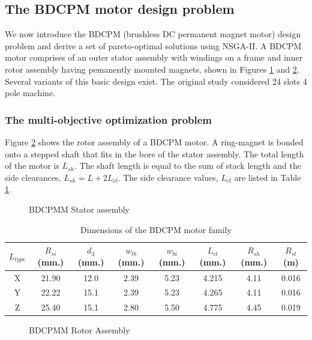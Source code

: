 \subsection{The BDCPM motor design problem}
We now introduce the BDCPM (brushless DC permanent magnet motor) 
design problem and derive a set of pareto-optimal solutions using 
NSGA-II. A BDCPM motor comprises of an outer stator assembly with 
windings on a frame  and inner rotor assembly having pemanently 
mounted magnets, shown in Figures \ref{bdcpmStator} and 
\ref{bdcpmRotor}. Several variants of this basic design exist. The 
original study \cite{chidambaram1999} considered 24 slots 4 pole 
machine.


\subsubsection{The multi-objective optimization problem}
Figure \ref{bdcpmRotor} shows the rotor assembly of a BDCPM motor. A
ring-magnet is bonded onto a stepped shaft that fits in the bore of
the stator assembly. The total length of the motor is $L_{sh}$. The 
shaft length is equal to the sum of stack length and the side 
clearances, $ L_{sh} = L + 2L_{cl}$. The side clearance values, 
$L_{cl}$ are listed in Table \ref{ltypeDimTable}.

\begin{figure}[ht]\begin{center}
 \caption{BDCPMM Stator assembly}
 \label{bdcpmStator}
\end{center}\end{figure}

\begin{table}[!ht]
\centering
\begin{tabular}{|c|c|c|c|c|c|c|c|}
 \hline
 $L_{type}$ & $R_{si}$ (mm.) & $d_3$ (mm.) & $w_{tb}$ (mm.) & $w_{bi}$ (mm.) & $L_{cl}$ (mm.)& $R_{sh}$ (mm.) & $R_{st}$ (m) \\
 \hline
 X & 21.90 & 12.0 & 2.39 & 5.23 & 4.215 & 4.11 & 0.016 \\
 \hline
 Y & 22.22 & 15.1 & 2.39 & 5.23 & 4.265 & 4.11 & 0.016 \\
 \hline
 Z & 25.40 & 15.1 & 2.80 & 5.50 & 4.775 & 4.45 & 0.019 \\
 \hline
 \end{tabular}
\caption{Dimensions of the BDCPM motor family}
\label{ltypeDimTable}
\end{table}

\begin{figure}[ht]\begin{center}
 \caption{BDCPMM Rotor Assembly}
 \label{bdcpmRotor}
\end{center}\end{figure}

